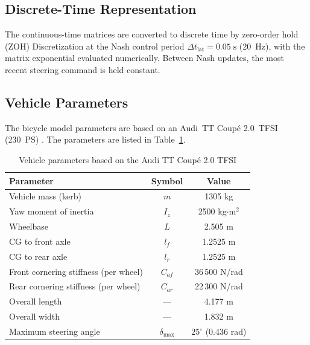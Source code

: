 \documentclass[12pt,a4paper,oneside]{report}
\begin{document}
\subsection{Discrete-Time Representation}

The continuous-time matrices are converted to discrete time by zero-order hold (ZOH)
Discretization at the Nash control period $\Delta t_{\mathrm{lat}} = 0.05\;\mathrm{s}$
(20~Hz), with the matrix exponential evaluated numerically. Between Nash updates, the
most recent steering command is held constant.

\subsection{Vehicle Parameters}

The bicycle model parameters are based on an Audi~TT Coup\'e 2.0~TFSI (230~PS)
\cite{rajamaniVehicleDynamicsControl2005}. The parameters are listed in
Table~\ref{tab:vehicle_params_ch2}.

\begin{table}[ht]
\centering
\begin{tabular}{|l|c|c|}
\hline
\textbf{Parameter} & \textbf{Symbol} & \textbf{Value} \\
\hline
Vehicle mass (kerb)                   & $m$             & 1305 kg \\
Yaw moment of inertia                 & $I_z$           & 2500 kg$\cdot$m$^2$ \\
Wheelbase                             & $L$             & 2.505 m \\
CG to front axle                      & $l_f$           & 1.2525 m \\
CG to rear axle                       & $l_r$           & 1.2525 m \\
Front cornering stiffness (per wheel) & $C_{af}$        & 36\,500 N/rad \\
Rear cornering stiffness (per wheel)  & $C_{ar}$        & 22\,300 N/rad \\
Overall length                        & ---             & 4.177 m \\
Overall width                         & ---             & 1.832 m \\
Maximum steering angle                & $\delta_{\max}$ & $25^\circ$ (0.436 rad) \\
\hline
\end{tabular}
\caption{Vehicle parameters based on the Audi TT Coup\'e 2.0 TFSI \cite{AudiTTCoupeTechnicalData}}
\label{tab:vehicle_params_ch2}
\end{table}
\end{document}
